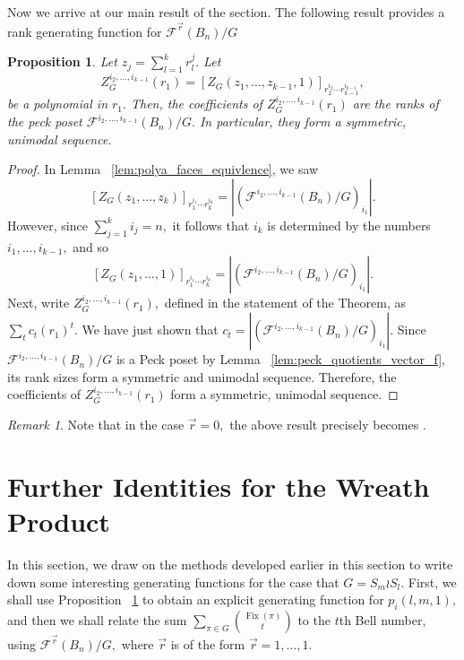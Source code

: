 \documentclass{amsart}
\newtheorem{prop}[thm]{Proposition}
\theoremstyle{remark}
\newtheorem{rem}[thm]{Remark}
\renewcommand{\vec}[1]{\overrightarrow{#1}}
\def\Fix{\operatorname{Fix}}
\begin{document}
Now we arrive at our main result of the section. The following result provides a rank generating function for $\mathcal F^{\vec r}(B_n)/G$

\begin{prop}
\label{prop:rank_gen_fn}
Let $z_j = \sum_{l = 1}^k r_l^j.$ Let $$Z_G^{i_2,\ldots,i_{k-1}}(r_1) =[Z_G(z_1,\ldots, z_{k-1},1)]_{r_2^{i_2}\cdots r_{k-1}^{i_{k-1}}},$$ be a polynomial in $r_1.$ Then, the coefficients of $Z_G^{i_2,\ldots,i_{k-1}}(r_1)$ are the ranks of the peck poset  $\mathcal F^{i_2,\ldots, i_{k-1}}(B_n)/G.$ In particular, they form a symmetric, unimodal sequence.
\end{prop}
\begin{proof}
In Lemma ~\ref{lem:polya_faces_equivlence}, we saw $$[Z_G(z_1,\ldots, z_k)]_{r_1^{i_1} \cdots r_k^{i_k}}=|(\mathcal F^{i_2,\ldots, i_{k-1}}(B_n)/G)_{i_1}|.$$
However, since $\sum_{j = 1}^k i_j = n,$ it follows that $i_k$ is determined by the numbers $i_1,\ldots, i_{k-1},$ and so 
$$[Z_G(z_1,\ldots, 1)]_{r_1^{i_1} \cdots r_k^{i_k}}=|(\mathcal F^{i_2,\ldots, i_{k-1}}(B_n)/G)_{i_1}|.$$
Next, write $Z_G^{i_2,\ldots,i_{k-1}}(r_1),$ defined in the statement of the Theorem, as $\sum_{t} c_t (r_1)^t.$ We have just shown that $c_t = |(\mathcal F^{i_2,\ldots, i_{k-1}}(B_n)/G)_{i_1}|.$ Since $\mathcal F^{i_2,\ldots, i_{k-1}}(B_n)/G$ is a Peck poset by Lemma ~\ref{lem:peck_quotients_vector_f}, its rank sizes form a symmetric and unimodal sequence. Therefore, the coefficients of $Z_G^{i_2,\ldots,i_{k-1}}(r_1)$ form a symmetric, unimodal sequence.
\end{proof}

\begin{rem}
Note that in the case $\vec r = 0,$ the above result precisely becomes \cite[Corollary 7.16]{algebraic_stanley}.
\end{rem}

\section{Further Identities for the Wreath Product}
In this section, we draw on the methods developed earlier in this section to write down some interesting generating functions for the case that $G = S_m \wr S_l.$
First, we shall use Proposition ~\ref{prop:rank_gen_fn} to obtain an explicit generating function for $p_i(l,m,1),$ and then we shall relate the sum $\sum_{\pi \in G} \binom{\Fix(\pi)}{t}$ to the $t$th Bell number, using $\mathcal F^{\vec r}(B_n)/G,$ where $\vec r$ is of the form $\vec r = 1,\ldots, 1$.
\end{document}
